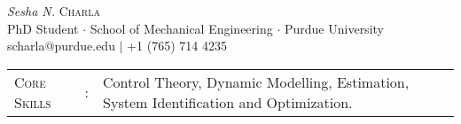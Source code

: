 \documentclass[letterpaper,10pt]{article}
\begin{document}
\begin{center}
\thispagestyle{empty}
\huge{\textit{Sesha N.} \textsc{Charla}}\\
\small PhD Student $\cdot$ School of Mechanical Engineering $\cdot$ Purdue University\\
\small scharla@purdue.edu $\mid$ +1 (765) 714 4235   \\
\end{center}


\begin{tabular}{l c l}
{\large{\textsc{Core Skills}}}&:& Control Theory, Dynamic Modelling, Estimation,
System Identification and Optimization.\\
\end{tabular}

\end{document}

